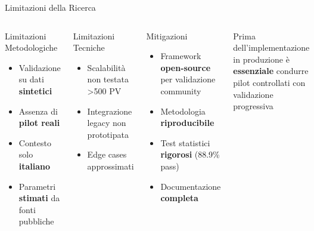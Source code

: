 \documentclass[aspectratio=169,10pt]{beamer}
\begin{document}
\begin{frame}{Limitazioni della Ricerca}
\begin{columns}[T]
\begin{alertblock}{Limitazioni Metodologiche}
\begin{itemize}
    \item Validazione su dati \textbf{sintetici}
    \item Assenza di \textbf{pilot reali}
    \item Contesto solo \textbf{italiano}
    \item Parametri \textbf{stimati} da fonti pubbliche
\end{itemize}
\end{alertblock}

\begin{block}{Limitazioni Tecniche}
\begin{itemize}
    \item Scalabilità non testata >500 PV
    \item Integrazione legacy non prototipata
    \item Edge cases approssimati
\end{itemize}
\end{block}

\begin{exampleblock}{Mitigazioni}
\begin{itemize}
    \item Framework \textbf{open-source} per validazione community
    \item Metodologia \textbf{riproducibile}
    \item Test statistici \textbf{rigorosi} (88.9\% pass)
    \item Documentazione \textbf{completa}
\end{itemize}
\end{exampleblock}

\begin{tcolorbox}[colback=yellow!10,colframe=orange!50,title=Nota Importante]
\footnotesize
Prima dell'implementazione in produzione è \textbf{essenziale} condurre pilot controllati con validazione progressiva
\end{tcolorbox}
\end{columns}
\end{frame}
\end{document}
